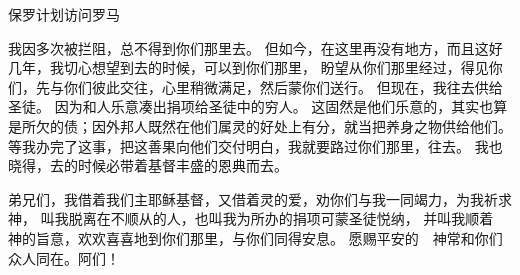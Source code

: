 {\par }{\SH 保罗计划访问罗马
\par }{\PP {}我因多次被拦阻，总不得到你们那里去。
但如今，在这里再没有{}地方，而且这好几年，我切心想望到{}去的时候，可以到你们那里，
盼望从你们那里经过，得见你们，先与你们彼此交往，心里稍微满足，然后蒙你们送行。
但现在，我往{}去供给圣徒。
因为{}和{}人乐意凑出捐项给{}圣徒中的穷人。
这固然是他们乐意的，其实也算是所欠的债；因外邦人既然在他们属灵的好处上有分，就当把养身之物供给他们。
等我办完了这事，把这善果向他们交付明白，我就要路过你们那里，往{}去。
我也晓得，去的时候必带着基督丰盛的恩典而去。
\par }{\PP {}弟兄们，我借着我们主耶稣基督，又借着{}灵的爱，劝你们与我一同竭力，为我祈求　神，
叫我脱离在{}不顺从的人，也叫我为{}所办的捐项可蒙圣徒悦纳，
并叫我顺着　神的旨意，欢欢喜喜地到你们那里，与你们同得安息。
愿赐平安的　神常和你们众人同在。阿们！

}
